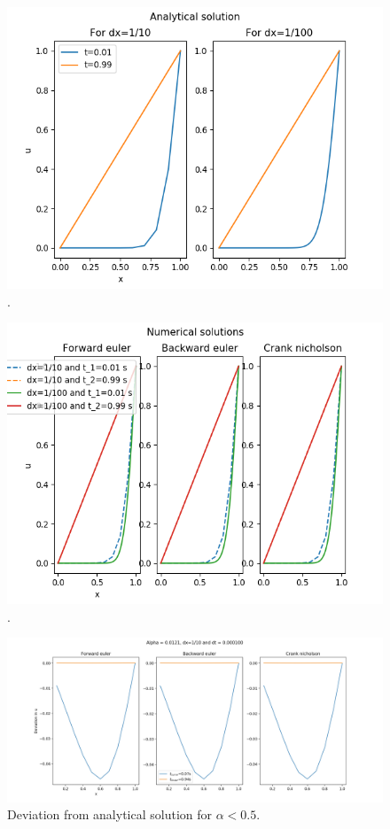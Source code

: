 \documentclass{article}
\begin{document}
\begin{figure}[H]
	\centering
	\includegraphics[width=140mm]{b.png}
	\caption{.}
	\label{fig:b}
\end{figure}

\begin{figure}[H]
	\centering
	\includegraphics[width=140mm]{c.png}
	\caption{.}
	\label{fig:c}
\end{figure}

\begin{figure}[H]
	\centering
	\includegraphics[width=180mm]{1_10}
	\caption{Deviation from analytical solution for $\alpha<0.5$.}
	\label{fig:1_10}
\end{figure}
\end{document}
